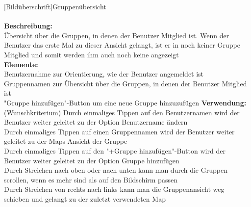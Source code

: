[Bildüberschrift]Gruppenübersicht\\ \\
\textbf{Beschreibung:}\\
Übersicht über die Gruppen, in denen der Benutzer Mitglied ist. Wenn der Benutzer das erste Mal zu dieser Ansicht gelangt, ist er in noch keiner Gruppe Mitglied und somit werden ihm auch noch keine angezeigt\\
\textbf{Elemente:}\\
Benutzernahme zur Orientierung, wie der Benutzer angemeldet ist\\
Gruppennamen zur Übersicht über die Gruppen, in denen der Benutzer Mitglied ist\\
"Gruppe hinzufügen"-Button um eine neue Gruppe hinzuzufügen
\textbf{Verwendung:}\\
(Wunschkriterium) Durch einmaliges Tippen auf den Benutzernamen wird der Benutzer weiter geleitet zu der Option Benutzername ändern\\
Durch einmaliges Tippen auf einen Gruppennamen wird der Benutzer weiter geleitet zu der Maps-Ansicht der Gruppe\\
Durch einmaliges Tippen auf den "+Gruppe hinzufügen"-Button wird der Benutzer weiter geleitet zu der Option Gruppe hinzufügen\\
Durch Streichen nach oben oder nach unten kann man durch die Gruppen scrollen, wenn es mehr sind als auf den Bildschirm passen\\
Durch Streichen von rechts nach links kann man die Gruppenansicht weg schieben und gelangt zu der zuletzt verwendeten Map\\ \\

